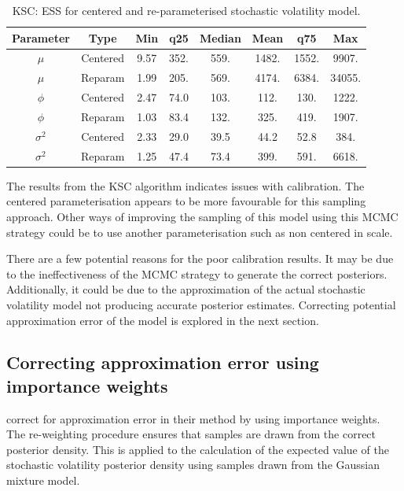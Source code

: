 \documentclass[12pt, a4paper]{article}
\begin{document}
    \begin{table}[H]
        \centering
        \begin{tabular}{|c|c|c|c|c|c|c|c|} \hline 
        Parameter &  Type&Min& q25&  Median& Mean & q75&Max\\ \hline 
        $\mu$&  Centered&9.57 & 352. & 559. & 1482. & 1552. & 9907.\\
     $\mu$&  Reparam&1.99 & 205. & 569. & 4174. & 6384. & 34055.\\\hline 
     $\phi$&  Centered&2.47 & 74.0 & 103. & 112. & 130. & 1222.\\
     $\phi$&  Reparam&1.03 & 83.4 & 132. & 325. & 419. & 1907. \\ \hline 
     $\sigma^2$&  Centered&2.33 & 29.0 & 39.5 & 44.2 & 52.8 & 384. \\ 
     $\sigma^2$&  Reparam&1.25 & 47.4 & 73.4 & 399. & 591. & 6618. \\ \hline
        \end{tabular}
        \caption{KSC: ESS for centered and re-parameterised stochastic volatility model.}
        \label{tab:kscess}
    \end{table}

    The results from the KSC algorithm indicates issues with calibration. The centered parameterisation appears to be more favourable for this sampling approach. Other ways of improving the sampling of this model using this MCMC strategy could be to use another parameterisation such as non centered in scale.

    There are a few potential reasons for the poor calibration results. It may be due to the ineffectiveness of the MCMC strategy to generate the correct posteriors. Additionally, it could be due to the approximation of the actual stochastic volatility model not producing accurate posterior estimates. Correcting potential approximation error of the model is explored in the next section.  

    \subsection{Correcting approximation error using importance weights}
    \citet{kim1998stochastic} correct for approximation error in their method by using importance weights. The re-weighting procedure ensures that samples are drawn from the correct posterior density. This is applied to the calculation of the expected value of the stochastic volatility posterior density using samples drawn from the Gaussian mixture model. 
\end{document}
